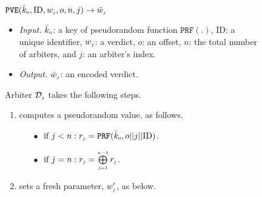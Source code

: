 \begin{figure}[!ht]
\setlength{\fboxsep}{0.7pt}
\begin{center}
\begin{boxedminipage}{12.3cm}
\small{
\underline{$\mathtt{PVE}(\bar{k}_{\scriptscriptstyle 0}, \text{ID},  w_{\scriptscriptstyle j}, o, n,  j)\rightarrow  \bar{  w}_{\scriptscriptstyle j}$}\\
%
\begin{itemize}
\item \noindent\textit{Input.} $\bar{k}_{\scriptscriptstyle 0}$: a key of  pseudorandom function $\mathtt{PRF}(.)$, $\text{ID}$: a unique identifier, $ w_{\scriptscriptstyle j}$: a  verdict, $o$: an offset, $n$: the total number of  arbiters,  and  $j$: an arbiter's index.
%
\item \noindent\textit{Output.} $\bar{  w}_{\scriptscriptstyle j}$:  an  encoded verdict.  
%
\end{itemize}
Arbiter $\mathcal{D}_{\scriptscriptstyle j}$ takes the following steps.
\begin{enumerate}
%
\item\label{ZSPA:val-gen} computes a  pseudorandom  value,  as follows. 
%
%
\begin{itemize}
%
\item[$\bullet$]$ \text{ if } j< n: r_{\scriptscriptstyle j}=\mathtt{PRF}(\bar k_{\scriptscriptstyle 0}, o||j||\text{ID})$.\\
%
\item [$\bullet$] $ \text{ if } j=n: r_{\scriptscriptstyle j}= \bigoplus\limits^{\scriptscriptstyle n-1}_{\scriptscriptstyle j=1} r_{\scriptscriptstyle j}$.
%
\end{itemize}
%
\item  sets a fresh parameter, $w'_{\scriptscriptstyle j}$, as below. 
%


\end{enumerate}}
\end{boxedminipage}
\end{center}
\end{figure}
